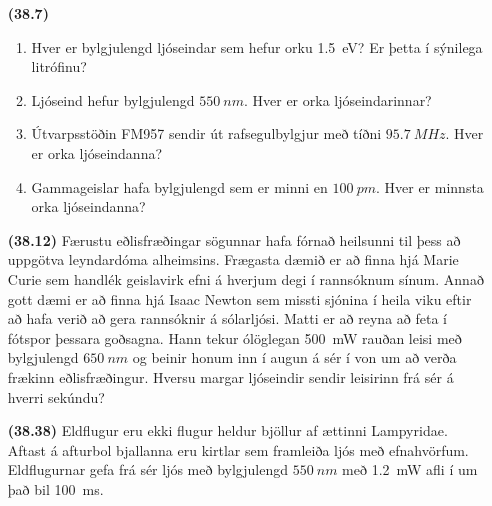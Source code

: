 \begin{enumerate}[label = \textbf{(\alph*)}]

\item[\textbf{(38.7)}] 
\begin{enumerate}[label = \textbf{(\alph*)}]
\item Hver er bylgjulengd ljóseindar sem hefur orku \SI{1.5}{eV}? Er þetta í sýnilega litrófinu?
\item Ljóseind hefur bylgjulengd $\SI{550}{nm}$. Hver er orka ljóseindarinnar?
\item Útvarpsstöðin FM957 sendir út rafsegulbylgjur með tíðni $\SI{95.7}{MHz}$. Hver er orka ljóseindanna?
\item Gammageislar hafa bylgjulengd sem er minni en $\SI{100}{pm}$. Hver er minnsta orka ljóseindanna?
\end{enumerate}

\item[\textbf{(38.12)}] Færustu eðlisfræðingar sögunnar hafa fórnað heilsunni til þess að uppgötva leyndardóma alheimsins. Frægasta dæmið er að finna hjá Marie Curie sem handlék geislavirk efni á hverjum degi í rannsóknum sínum. Annað gott dæmi er að finna hjá Isaac Newton sem missti sjónina í heila viku eftir að hafa verið að gera rannsóknir á sólarljósi. Matti er að reyna að feta í fótspor þessara goðsagna. Hann tekur ólöglegan \SI{500}{mW} rauðan leisi með bylgjulengd $\SI{650}{nm}$ og beinir honum inn í augun á sér í von um að verða frækinn eðlisfræðingur. Hversu margar ljóseindir sendir leisirinn frá sér á hverri sekúndu?


\item[\textbf{(38.38)}] Eldflugur eru ekki flugur heldur bjöllur af ættinni Lampyridae. Aftast á afturbol bjallanna eru kirtlar sem framleiða ljós með efnahvörfum. Eldflugurnar gefa frá sér ljós með bylgjulengd $\SI{550}{nm}$ með \SI{1.2}{mW} afli í um það bil \SI{100}{ms}. 

\end{enumerate}
